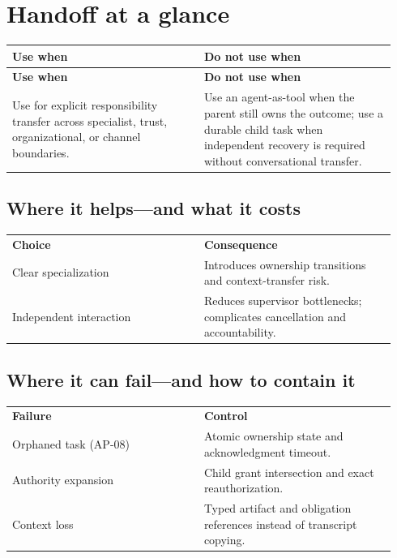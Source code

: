 \section{Handoff at a glance}

\BookTableStart
\small
\begin{longtable}{@{}Y{0.4700\linewidth}Y{0.4700\linewidth}@{}}
\color{white}\bfseries \textbf{Use when} & \color{white}\bfseries \textbf{Do not use when} \\
\endfirsthead
{}
\color{white}\bfseries \textbf{Use when} & \color{white}\bfseries \textbf{Do not use when} \\
\endhead
Use for explicit responsibility transfer across specialist, trust, organizational, or channel boundaries. & Use an agent-as-tool when the parent still owns the outcome; use a durable child task when independent recovery is required without conversational transfer. \\
\end{longtable}
\BookTableEnd

\subsection{Where it helps—and what it costs}

\BookTableStart
\small
\begin{tabular}{@{}Y{0.4700\linewidth}Y{0.4700\linewidth}@{}}
\color{white}\bfseries \textbf{Choice} & \color{white}\bfseries \textbf{Consequence} \\
Clear specialization & Introduces ownership transitions and context-transfer risk. \\
Independent interaction & Reduces supervisor bottlenecks; complicates cancellation and accountability. \\
\end{tabular}
\BookTableEnd

\subsection{Where it can fail—and how to contain it}

\BookTableStart
\small
\begin{tabular}{@{}Y{0.4700\linewidth}Y{0.4700\linewidth}@{}}
\color{white}\bfseries \textbf{Failure} & \color{white}\bfseries \textbf{Control} \\
Orphaned task (AP-08) & Atomic ownership state and acknowledgment timeout. \\
Authority expansion & Child grant intersection and exact reauthorization. \\
Context loss & Typed artifact and obligation references instead of transcript copying. \\
\end{tabular}
\BookTableEnd

